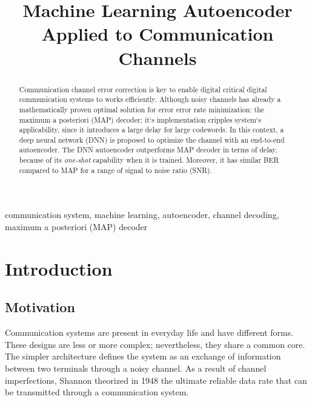 \documentclass[conference]{IEEEtran}
\begin{document}
\title{Machine Learning Autoencoder Applied to Communication Channels}


\author{
}


\maketitle

\begin{abstract}

Communication channel error correction is key to enable digital critical digital communication systems to works efficiently. Although noisy channels has already a mathematically proven optimal solution for error error rate minimization: the maximum a posteriori (MAP) decoder; it`s implementation cripples  system`s applicability, since it introduces a large delay for large codewords. In this context, a deep neural network (DNN) is proposed to optimize the channel with an end-to-end autoencoder. The DNN autoencoder outperforms MAP decoder in terms of delay, because of its \textit{one-shot} capability when it is trained. Moreover, it has similar BER compared to MAP for a range of signal to noise ratio (SNR). 

\end{abstract}

\begin{IEEEkeywords}
communication system, machine learning,  autoencoder, channel decoding, maximum a posteriori (MAP) decoder 
\end{IEEEkeywords}

\section{Introduction}
\subsection{Motivation}
Communication systems are present in everyday life and have different forms. These designs are less or more complex; nevertheless, they share a common core. The simpler architecture defines the system as an exchange of information between two terminals through a noisy channel. As a result of channel imperfections, Shannon theorized \cite{b1} in 1948 the ultimate reliable data rate that can be transmitted through a communication system.
\end{document}
